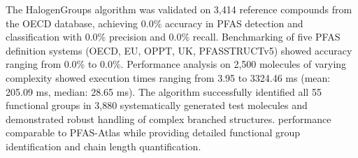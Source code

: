 
The HalogenGroups algorithm was validated on 3,414 reference compounds from the OECD database, achieving 0.0\% accuracy in PFAS detection and classification with 0.0\% precision and 0.0\% recall. Benchmarking of five PFAS definition systems (OECD, EU, OPPT, UK, PFASSTRUCTv5) showed accuracy ranging from 0.0\% to 0.0\%. Performance analysis on 2,500 molecules of varying complexity showed execution times ranging from 3.95 to 3324.46 ms (mean: 205.09 ms, median: 28.65 ms). The algorithm successfully identified all 55 functional groups in 3,880 systematically generated test molecules and demonstrated robust handling of complex branched structures. performance comparable to PFAS-Atlas while providing detailed functional group identification and chain length quantification.


